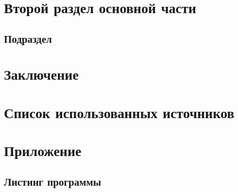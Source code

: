 \documentclass{article}
\begin{document}
\newpage

\section{Второй раздел основной части}
\subsection{Подраздел}

\newpage

\section*{Заключение}

\newpage

\section*{Список использованных источников}

\newpage

\section*{Приложение}

\newpage

\subsection*{Листинг программы}
\end{document}
